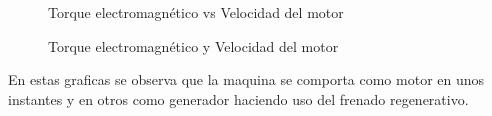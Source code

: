 \documentclass[a4paper, 10pt, onecolumn,journal]{ieeeconf}
\begin{document}
\begin{figure}[H]
	\centering
	\begin{adjustbox}{max width=\columnwidth}
	\end{adjustbox}
	\caption{Torque electromagnético vs Velocidad del motor}
	\label{Torque electromagnético vs Velocidad del motor}
\end{figure}
\begin{figure}[H]
	\centering
	\begin{adjustbox}{max width=\columnwidth}
	\end{adjustbox}
	\caption{Torque electromagnético y Velocidad del motor}
	\label{Torque electromagnético y Velocidad del motor}
\end{figure}
En estas graficas se observa que la maquina se comporta como motor en unos instantes y en otros como generador haciendo uso del frenado regenerativo.
\end{document}
